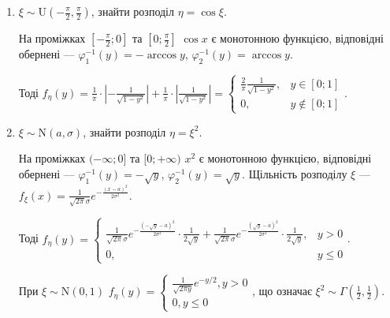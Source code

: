\begin{example}
    \begin{enumerate}
        \item $\xi \sim \mathrm{U}(-\frac{\pi}{2}, \frac{\pi}{2})$, знайти розподіл $\eta = \cos\xi$.

        На проміжках $[-\frac{\pi}{2}; 0]$ та $[0; \frac{\pi}{2}]$ $\cos x$ є монотонною функцією, 
        відповідні обернені --- $\varphi_1^{-1} (y) = -\arccos y$, $\varphi_2^{-1} (y) = \arccos y$.

        Тоді $f_\eta (y) = \frac{1}{\pi} \cdot \left| - \frac{1}{\sqrt{1-y^2}}\right| + \frac{1}{\pi} \cdot \left|\frac{1}{\sqrt{1-y^2}}\right| = \begin{cases}
            \frac{2}{\pi} \frac{1}{\sqrt{1-y^2}}, & y \in [0; 1] \\
            0, & y \notin [0; 1]
        \end{cases}$.
        \item $\xi \sim \mathrm{N}(a, \sigma)$, знайти розподіл $\eta = \xi^2$.

        На проміжках $(-\infty; 0]$ та $[0; +\infty)$ $x^2$ є монотонною функцією, 
        відповідні обернені --- $\varphi_1^{-1} (y) = -\sqrt{y}$, $\varphi_2^{-1} (y) = \sqrt{y}$.
        Щільність розподілу $\xi$ --- $f_\xi (x) = \frac{1}{\sqrt{2\pi}\sigma} e^{-\frac{(x-a)^2}{2\sigma^2}}$.

        Тоді $f_\eta (y) = \begin{cases}
            \frac{1}{\sqrt{2\pi}\sigma} e^{-\frac{(-\sqrt{y}-a)^2}{2\sigma^2}} \cdot \frac{1}{2\sqrt{y}} + 
        \frac{1}{\sqrt{2\pi}\sigma} e^{-\frac{(\sqrt{y}-a)^2}{2\sigma^2}} \cdot \frac{1}{2\sqrt{y}}, & y > 0 \\
        0, & y \leq 0
        \end{cases}$.

        При $\xi \sim \mathrm{N}(0, 1)$ $f_\eta(y) = \begin{cases}
            \frac{1}{\sqrt{2\pi y}} e^{-y/2}, y > 0 \\
            0, y \leq 0
        \end{cases}$, що означає $\xi^2 \sim \Gamma(\frac{1}{2}, \frac{1}{2})$.
    \end{enumerate}
\end{example}

